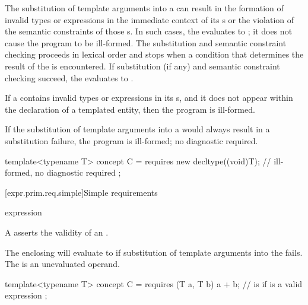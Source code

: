 \pnum
The substitution of template arguments into a 
can result in
the formation of invalid types or expressions in the immediate context of
its s or
the violation of the semantic constraints of those s.
In such cases, the  evaluates to ;
it does not cause the program to be ill-formed.
The substitution and semantic constraint checking
proceeds in lexical order and stops when a condition that
determines the result of the  is encountered.
If substitution (if any) and semantic constraint checking succeed,
the  evaluates to .
\begin{note}
If a  contains invalid types or expressions in
its s, and it does not appear within the declaration of a templated
entity, then the program is ill-formed.
\end{note}
If the substitution of template arguments into a 
would always result in a substitution failure, the program is ill-formed;
no diagnostic required.
\begin{example}
\begin{codeblock}
template<typename T> concept C =
requires {
  new decltype((void)T{});      // ill-formed, no diagnostic required
};
\end{codeblock}
\end{example}

[expr.prim.req.simple]{Simple requirements}
%

\begin{bnf}
\br
    expression \terminal{;}
\end{bnf}

\pnum
A  asserts
the validity of an .
\begin{note}
The enclosing  will evaluate to 
if substitution of template arguments into the  fails.
The  is an unevaluated operand.
\end{note}
\begin{example}
\begin{codeblock}
template<typename T> concept C =
  requires (T a, T b) {
    a + b;          //  is  if  is a valid expression
  };
\end{codeblock}
\end{example}

